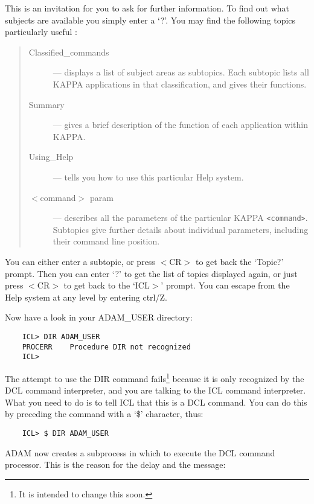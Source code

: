 This is an invitation for you to ask for further information.
To find out what subjects are available you simply enter a `?'.
You may find the following topics particularly useful :
\begin{quote}
\begin{description}
\item [Classified\_commands] --- displays a list of subject areas as subtopics.
Each subtopic lists all KAPPA applications in that classification, and gives
their functions.
\item [Summary] --- gives a brief description of the function of each
application within KAPPA.
\item [Using\_Help] --- tells you how to use this particular Help system.
\item [$<$command$>$ param] --- describes all the parameters of the particular
KAPPA  {\tt <command>}.
Subtopics give further details about individual parameters, including their
command line position.
\end{description}
\end{quote}
You can either enter a subtopic, or press $<$CR$>$ to get back the `Topic?'
prompt.
Then you can enter `?' to get the list of topics displayed again, or just
press $<$CR$>$ to get back to the `ICL$>$' prompt.
You can escape from the Help system at any level by entering ctrl/Z.

Now have a look in your ADAM\_USER directory:

\begin{small}
\begin{verbatim}
    ICL> DIR ADAM_USER
    PROCERR    Procedure DIR not recognized
    ICL>
\end{verbatim}
\end{small}

The attempt to use the DIR command fails\footnote{It is intended to change
this soon.} because it is only recognized by the DCL command interpreter, and
you are talking to the ICL command interpreter.
What you need to do is to tell ICL that this is a DCL command.
You can do this by preceding the command with a `\$' character, thus:

\begin{small}
\begin{verbatim}
    ICL> $ DIR ADAM_USER
\end{verbatim}
\end{small}

ADAM now creates a subprocess in which to execute the DCL command processor.
This is the reason for the delay and the message:

